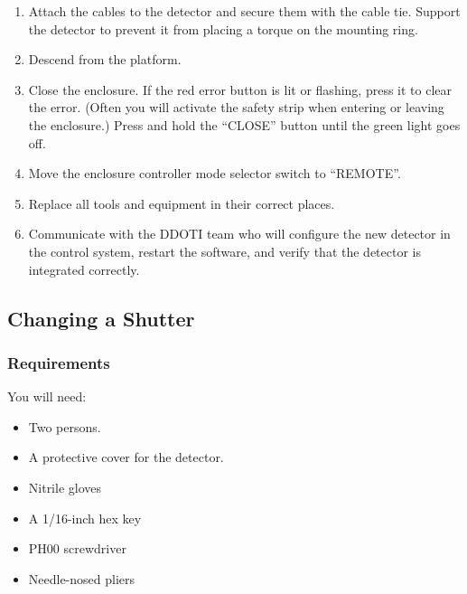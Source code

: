 \begin{enumerate}
\item Attach the cables to the detector and secure them with the cable tie. Support the detector to prevent it from placing a torque on the mounting ring.

\item Descend from the platform.

\item Close the enclosure. If the red error button is lit or flashing, press it to clear the error. (Often you will activate the safety strip when entering or leaving the enclosure.) Press and hold the “CLOSE” button until the green light goes off.

\item 
Move the enclosure controller mode selector switch to “REMOTE”.

\item
Replace all tools and equipment in their correct places.

\item Communicate with the DDOTI team who will configure the new detector in the control system, restart the software, and verify that the detector is integrated correctly.
\end{enumerate}

\subsection{Changing a Shutter}





\subsubsection{Requirements}

You will need:

\begin{itemize}
\item Two persons.
\item A protective cover for the detector.
\item Nitrile gloves
\item A 1/16-inch hex key
\item PH00 screwdriver
\item Needle-nosed pliers
\end{itemize}

